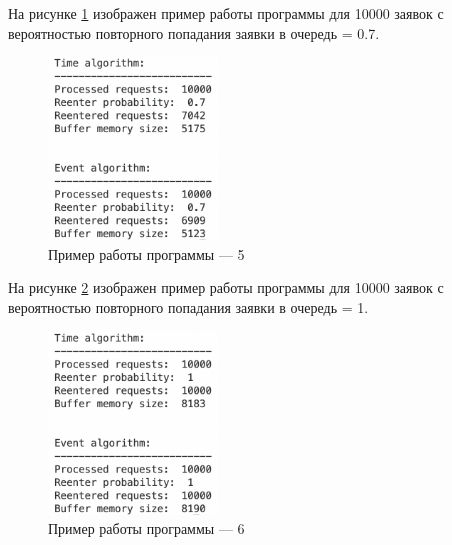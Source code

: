 \documentclass[12pt]{report}
\begin{document}
На рисунке \ref{fig:pic5} изображен пример работы программы для 10000 заявок с вероятностью повторного попадания заявки в очередь = 0.7.

\begin{figure}[h!btp]
	\centering
	\includegraphics[width=0.4\textwidth]{inc/pic5.png}
	\caption{Пример работы программы --- 5}
	\label{fig:pic5}	
\end{figure}

На рисунке \ref{fig:pic6} изображен пример работы программы для 10000 заявок с вероятностью повторного попадания заявки в очередь = 1.

\begin{figure}[h!btp]
	\centering
	\includegraphics[width=0.4\textwidth]{inc/pic6.png}
	\caption{Пример работы программы --- 6}
	\label{fig:pic6}	
\end{figure}

	
\end{document}
